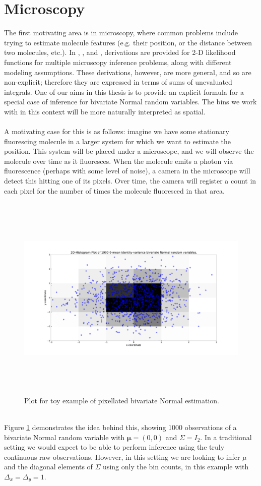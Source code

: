 \documentclass[11pt,a4,twosided,singlespacing,titlepagenumber=on,numbers=endperiod]{scrreprt}
\numberwithin{equation}{chapter} %
\theoremstyle{remark}
\begin{document}
\section{Microscopy}
The first motivating area is in microscopy, where common problems include trying to estimate molecule features (e.g. their position, or the distance between two molecules, etc.). In \cite{distance_estimation}, \cite{localization_accuracy}, and \cite{pixelation}, derivations are provided for 2-D likelihood functions for multiple microscopy inference problems, along with different modeling assumptions. These derivations, however, are more general, and so are non-explicit; therefore they are expressed in terms of sums of unevaluated integrals. One of our aims in this thesis is to provide an explicit formula for a special case of inference for bivariate Normal random variables. The bins we work with in this context will be more naturally interpreted as spatial. \\\\
A motivating case for this is as follows: imagine we have some stationary fluorescing molecule in a larger system for which we want to estimate the position. This system will be placed under a microscope, and we will observe the molecule over time as it fluoresces. When the molecule emits a photon via fluorescence (perhaps with some level of noise), a camera in the microscope will detect this hitting one of its pixels. Over time, the camera will register a count in each pixel for the number of times the molecule fluoresced in that area.
\begin{figure}[!h]
	\includegraphics[height=10cm, width=15cm]{2d_pixel.pdf}
	\centering
	\caption{Plot for toy example of pixellated bivariate Normal estimation.}
	\label{fig:2d_pixels}
\end{figure}\\\noindent
Figure \ref{fig:2d_pixels} demonstrates the idea behind this, showing 1000 observations of a bivariate Normal random variable with $\mathbf{\mu} = (0, 0)$ and $\Sigma = I_2$. In a traditional setting we would expect to be able to perform inference using the truly continuous raw observations. However, in this setting we are looking to infer $\mu$  and the diagonal elements of $\Sigma$ using only the bin counts, in this example with $\Delta_x = \Delta_y = 1$. 
\end{document}
